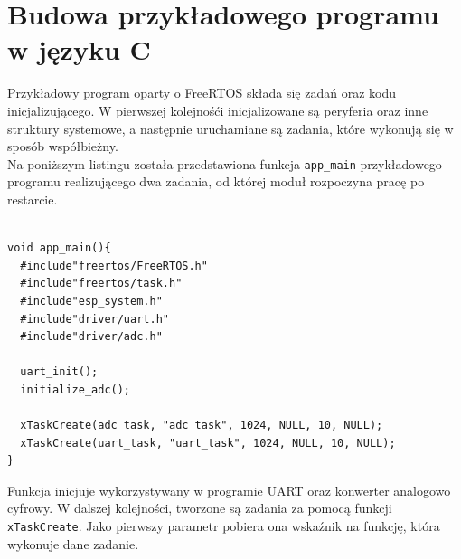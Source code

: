\section{Budowa przykładowego programu w języku C}
\label{example_C}
Przykładowy program oparty o FreeRTOS składa się zadań oraz kodu 
inicjalizującego. W pierwszej kolejnośći inicjalizowane są peryferia oraz inne struktury
systemowe, a następnie uruchamiane są zadania, które wykonują się w sposób współbieżny. \\

Na poniższym listingu została przedstawiona funkcja \texttt{app\_{}main} przykładowego programu
realizującego dwa zadania, od której moduł rozpoczyna pracę po restarcie.

\begin{lstlisting}[style=customc,
    frame=single,
    caption={Przykładowa funkcja \texttt{app\_{}main}},
    captionpos=b,
    label={esptool_basic}]

void app_main(){
  #include"freertos/FreeRTOS.h"
  #include"freertos/task.h"
  #include"esp_system.h"
  #include"driver/uart.h"
  #include"driver/adc.h"

  uart_init();
  initialize_adc();
    
  xTaskCreate(adc_task, "adc_task", 1024, NULL, 10, NULL);
  xTaskCreate(uart_task, "uart_task", 1024, NULL, 10, NULL);
}
\end{lstlisting}

Funkcja inicjuje wykorzystywany w programie UART oraz konwerter analogowo cyfrowy.
W dalszej kolejności, tworzone są zadania za pomocą funkcji \texttt{xTaskCreate}.
Jako pierwszy parametr pobiera ona wskaźnik na funkcję, która wykonuje dane zadanie.